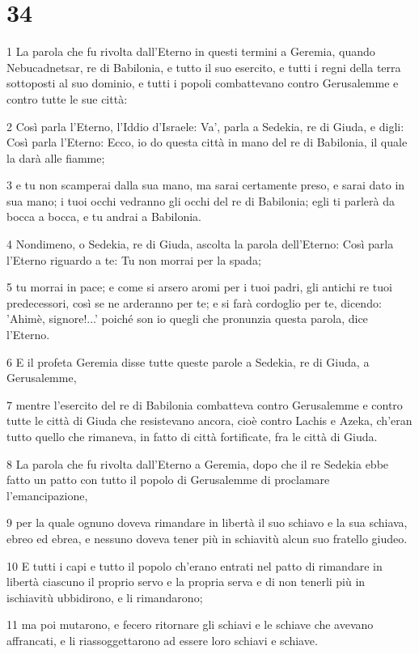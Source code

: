 \chapter{34}

\par 1 La parola che fu rivolta dall'Eterno in questi termini a Geremia, quando Nebucadnetsar, re di Babilonia, e tutto il suo esercito, e tutti i regni della terra sottoposti al suo dominio, e tutti i popoli combattevano contro Gerusalemme e contro tutte le sue città:
\par 2 Così parla l'Eterno, l'Iddio d'Israele: Va', parla a Sedekia, re di Giuda, e digli: Così parla l'Eterno: Ecco, io do questa città in mano del re di Babilonia, il quale la darà alle fiamme;
\par 3 e tu non scamperai dalla sua mano, ma sarai certamente preso, e sarai dato in sua mano; i tuoi occhi vedranno gli occhi del re di Babilonia; egli ti parlerà da bocca a bocca, e tu andrai a Babilonia.
\par 4 Nondimeno, o Sedekia, re di Giuda, ascolta la parola dell'Eterno: Così parla l'Eterno riguardo a te: Tu non morrai per la spada;
\par 5 tu morrai in pace; e come si arsero aromi per i tuoi padri, gli antichi re tuoi predecessori, così se ne arderanno per te; e si farà cordoglio per te, dicendo: 'Ahimè, signore!...' poiché son io quegli che pronunzia questa parola, dice l'Eterno.
\par 6 E il profeta Geremia disse tutte queste parole a Sedekia, re di Giuda, a Gerusalemme,
\par 7 mentre l'esercito del re di Babilonia combatteva contro Gerusalemme e contro tutte le città di Giuda che resistevano ancora, cioè contro Lachis e Azeka, ch'eran tutto quello che rimaneva, in fatto di città fortificate, fra le città di Giuda.
\par 8 La parola che fu rivolta dall'Eterno a Geremia, dopo che il re Sedekia ebbe fatto un patto con tutto il popolo di Gerusalemme di proclamare l'emancipazione,
\par 9 per la quale ognuno doveva rimandare in libertà il suo schiavo e la sua schiava, ebreo ed ebrea, e nessuno doveva tener più in schiavitù alcun suo fratello giudeo.
\par 10 E tutti i capi e tutto il popolo ch'erano entrati nel patto di rimandare in libertà ciascuno il proprio servo e la propria serva e di non tenerli più in ischiavitù ubbidirono, e li rimandarono;
\par 11 ma poi mutarono, e fecero ritornare gli schiavi e le schiave che avevano affrancati, e li riassoggettarono ad essere loro schiavi e schiave.
